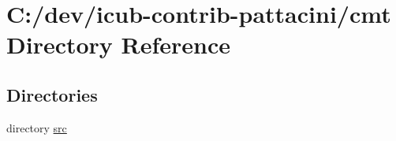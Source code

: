\section{C\+:/dev/icub-\/contrib-\/pattacini/cmt Directory Reference}
\label{dir_71c198eaee4b31e8bcb963a914907233}
\subsection*{Directories}
\begin{DoxyCompactItemize}
\item 
directory \hyperlink{dir_cd359a7feb00fc4a5afc21c4824c3dae}{src}
\end{DoxyCompactItemize}
